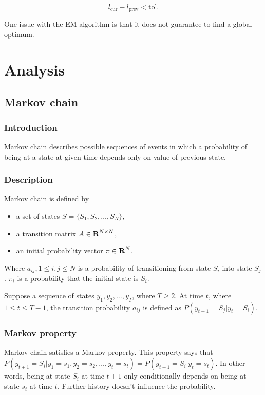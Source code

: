 \documentclass[thesis=B,english]{FITthesis}[2012/06/26]
\begin{document}
\begin{equation*}
l_{\text{cur}} - l_{\text{prev}} < \text{tol}.
\end{equation*}

One issue with the EM algorithm is that it does not guarantee to find a global optimum.

\chapter{Analysis}

\section{Markov chain}

\subsection{Introduction}
Markov chain describes possible sequences of events in which a probability of being at a state at given time depends only on value of previous state. 

\subsection{Description}

Markov chain is defined by

\begin{itemize}
\item a set of states $S = \{S_1, S_2, \dots, S_N\}$,
\item a transition matrix $A \in \textbf R^{N \times N}$,
\item an initial probability vector $\pi \in \textbf R^N$.
\end{itemize}

Where $a_{ij}, 1 \leq i,j \leq N$ is a probability of transitioning from state $S_i$ into state $S_j$. $\pi_i$ is a probability that the initial state is $S_i$.

Suppose a sequence of states $y_1, y_2, \dots, y_T$, where $T \geq 2$. At time $t$, where $1 \leq t \leq T-1$, the transition probability $a_{ij}$ is defined as $P(y_{t+1}=S_j | y_t=S_i)$.

\subsection{Markov property}
Markov chain satisfies a Markov property. This property says that $P(y_{t+1}=S_i|y_1=s_1,y_2=s_2,\dots,y_t=s_t) = P(y_{t+1}=S_{i}|y_t=s_t)$. In other words, being at state $S_i$ at time $t+1$ only conditionally depends on being at state $s_t$ at time $t$. Further history doesn't influence the probability.
\end{document}
